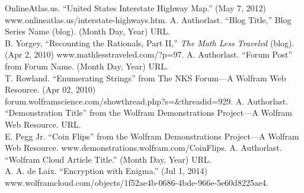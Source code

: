 \documentclass{article}
\begin{document}
\begin{thebibliography}{99}
OnlineAtlas.us. ``United States Interstate Highway Map.'' (May 7,
2012) www.onlineatlas.us/interstate-highways.htm.
A. Authorlast. ``Blog Title,'' Blog Series Name (blog). (Month Day, Year) URL.\\
B. Yorgey, ``Recounting the Rationals, Part II,'' \textit{The Math
Less Traveled} (blog). (Apr 2, 2010) www.mathlesstraveled.com/?p=97.
A. Authorlast. ``Forum Post'' from Forum Name. (Month Day, Year) URL.\\
T. Rowland. ``Enumerating Strings'' from The NKS Forum---A
Wolfram Web Resource. (Apr 02, 2010)\\
forum.wolframscience.com/showthread.php?s=$\&$threadid=929.
A. Authorlast. ``Demonstration Title'' from the Wolfram Demonstrations
Project---A Wolfram Web Resource. URL.\\
E. Pegg Jr. ``Coin Flips'' from the Wolfram Demonstrations Project---A
Wolfram Web Resource. www.demonstrations.wolfram.com/CoinFlips.
A. Authorlast. ``Wolfram Cloud Article Title.'' (Month Day, Year) URL.\\
A. A. de Laix. ``Encryption with Enigma.'' (Jul 1, 2014) www.wolframcloud.com/objects/1f52ae4b-0686-4bde-966e-5e60d8225ae4.
\end{thebibliography}
\end{document}
